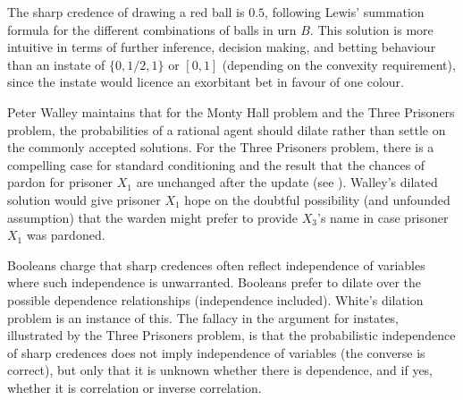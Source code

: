 \documentclass[11pt]{article}
\begin{document}
The sharp credence of drawing a red ball is $0.5$, following Lewis'
summation formula for the different combinations of balls in urn $B$.
This solution is more intuitive in terms of further inference,
decision making, and betting behaviour than an instate of
$\{0,1/2,1\}$ or $[0,1]$ (depending on the convexity requirement),
since the instate would licence an exorbitant bet in favour of one
colour.


Peter Walley maintains that for the Monty Hall problem and the Three
Prisoners problem, the probabilities of a rational agent should dilate
rather than settle on the commonly accepted solutions. For the Three
Prisoners problem, there is a compelling case for standard
conditioning and the result that the chances of pardon for prisoner
$X_{1}$ are unchanged after the update (see
). Walley's dilated solution would give
prisoner $X_{1}$ hope on the doubtful possibility (and unfounded
assumption) that the warden might prefer to provide $X_{3}$'s name in
case prisoner $X_{1}$ was pardoned.

Booleans charge that sharp credences often reflect independence of
variables where such independence is unwarranted. Booleans prefer to
dilate over the possible dependence relationships (independence
included). White's dilation problem is an instance of this. The
fallacy in the argument for instates, illustrated by the Three
Prisoners problem, is that the probabilistic independence of sharp
credences does not imply independence of variables (the converse is
correct), but only that it is unknown whether there is dependence, and
if yes, whether it is correlation or inverse correlation.

\end{document}
